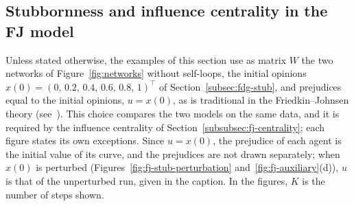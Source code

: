 \subsection{Stubbornness and influence centrality in the FJ model}
\label{subsec:fj-stub}

Unless stated otherwise, the examples of this section use as matrix $W$ the two
networks of Figure~\ref{fig:networks} without self-loops, the initial opinions
$x(0) = (0,\, 0.2,\, 0.4,\, 0.6,\, 0.8,\, 1)^\top$ of Section~\ref{subsec:fdg-stub},
and prejudices equal to the initial opinions, $u = x(0)$, as is traditional in the
Friedkin--Johnsen theory (see~\cite{proskurnikov2017tutorial}). This choice compares the
two models on the same data, and it is required by the influence centrality of
Section~\ref{subsubsec:fj-centrality}; each figure states its own exceptions. Since
$u = x(0)$, the prejudice of each agent is the initial value of its curve, and the
prejudices are not drawn separately; when $x(0)$ is perturbed
(Figures~\ref{fig:fj-stub-perturbation} and~\ref{fig:fj-auxiliary}(d)), $u$ is that of
the unperturbed run, given in the caption. In the figures, $K$ is the number of steps
shown.
